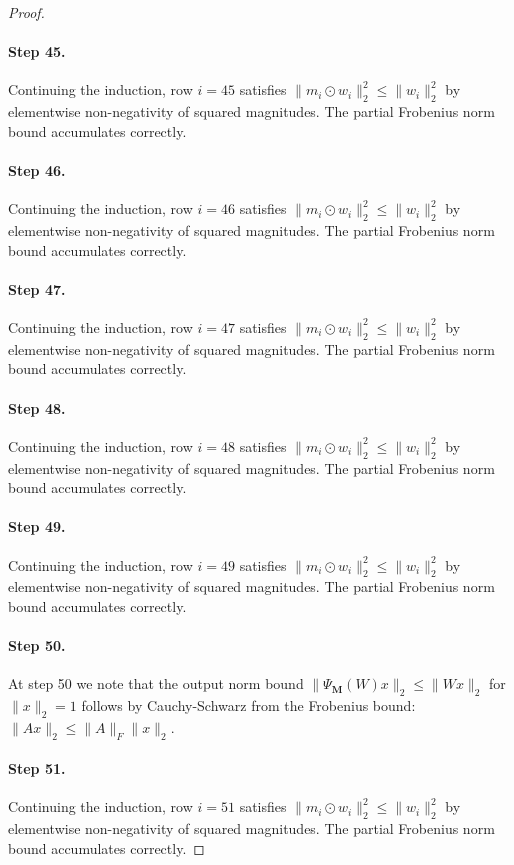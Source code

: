 \begin{proof}
\paragraph{Step 45.}
Continuing the induction, row $i=45$
satisfies $\|m_i \odot w_i\|_2^2 \leq \|w_i\|_2^2$ by elementwise non-negativity
of squared magnitudes.  The partial Frobenius norm bound accumulates correctly.

\paragraph{Step 46.}
Continuing the induction, row $i=46$
satisfies $\|m_i \odot w_i\|_2^2 \leq \|w_i\|_2^2$ by elementwise non-negativity
of squared magnitudes.  The partial Frobenius norm bound accumulates correctly.

\paragraph{Step 47.}
Continuing the induction, row $i=47$
satisfies $\|m_i \odot w_i\|_2^2 \leq \|w_i\|_2^2$ by elementwise non-negativity
of squared magnitudes.  The partial Frobenius norm bound accumulates correctly.

\paragraph{Step 48.}
Continuing the induction, row $i=48$
satisfies $\|m_i \odot w_i\|_2^2 \leq \|w_i\|_2^2$ by elementwise non-negativity
of squared magnitudes.  The partial Frobenius norm bound accumulates correctly.

\paragraph{Step 49.}
Continuing the induction, row $i=49$
satisfies $\|m_i \odot w_i\|_2^2 \leq \|w_i\|_2^2$ by elementwise non-negativity
of squared magnitudes.  The partial Frobenius norm bound accumulates correctly.

\paragraph{Step 50.}
At step 50 we note that the output norm bound
$\|\Psi_{\mathbf{M}}(W)x\|_2 \leq \|Wx\|_2$ for $\|x\|_2=1$ follows by
Cauchy-Schwarz from the Frobenius bound: $\|Ax\|_2 \leq \|A\|_F \|x\|_2$.
\cite{evci2020rigging}

\paragraph{Step 51.}
Continuing the induction, row $i=51$
satisfies $\|m_i \odot w_i\|_2^2 \leq \|w_i\|_2^2$ by elementwise non-negativity
of squared magnitudes.  The partial Frobenius norm bound accumulates correctly.


\end{proof}
